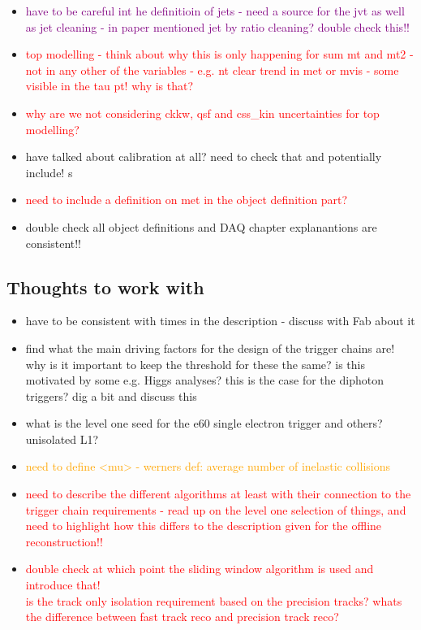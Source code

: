 \begin{itemize}
    \item \textcolor{purple}{have to be careful int he definitioin of jets - need a source for the jvt as well as jet cleaning - in paper mentioned jet by ratio cleaning? double check this!!}
    \item \textcolor{red}{top modelling - think about why this is only happening for sum mt and mt2 - not in any other of the variables - e.g.  nt clear trend in met or mvis - some visible in the tau pt! why is that?}
    \item \textcolor{red}{why are we not considering ckkw, qsf and css\_kin uncertainties for top modelling?}
    \item have talked about calibration at all? need to check that and potentially include! s
    \item \textcolor{red}{need to include a definition on met in the object definition part? }
    \item double check all object definitions and DAQ chapter explanantions are consistent!!
\end{itemize}





\subsection{Thoughts to work with}
\begin{itemize}
    \item have to be consistent with times in the description - discuss with Fab about it
    \item find what the main driving factors for the design of the trigger chains are! why is it important to keep the threshold for these the same? is this motivated by some e.g. Higgs analyses? this is the case for the diphoton triggers? dig a bit and discuss this
    \item what is the level one seed for the e60 single electron trigger and others? unisolated L1?
    \item \textcolor{orange}{need to define <mu> - werners def: average number of inelastic collisions}
    \item \textcolor{red}{need to describe the different algorithms at least with their connection to the trigger chain requirements - read up on the level one selection of things, and need to highlight how this differs to the description given for the offline reconstruction!!}
    \item \textcolor{red}{double check at which point the sliding window algorithm is used and introduce that!}\\
        \textcolor{red}{is the track only isolation requirement based on the precision tracks? whats the difference between fast track reco and precision track reco? }
\end{itemize}





